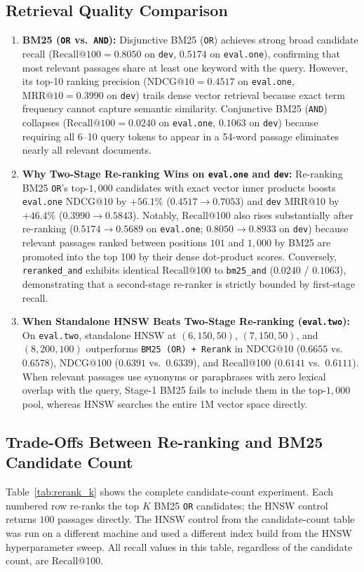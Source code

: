 \documentclass[11pt]{article}
\begin{document}
\subsection{Retrieval Quality Comparison}
\begin{enumerate}
    \item \textbf{BM25 (\texttt{OR} vs.\ \texttt{AND}):} Disjunctive BM25 (\texttt{OR}) achieves strong broad candidate recall ($\text{Recall@100} = 0.8050$ on \texttt{dev}, $0.5174$ on \texttt{eval.one}), confirming that most relevant passages share at least one keyword with the query. However, its top-10 ranking precision ($\text{NDCG@10} = 0.4517$ on \texttt{eval.one}, $\text{MRR@10} = 0.3990$ on \texttt{dev}) trails dense vector retrieval because exact term frequency cannot capture semantic similarity. Conjunctive BM25 (\texttt{AND}) collapses ($\text{Recall@100} = 0.0240$ on \texttt{eval.one}, $0.1063$ on \texttt{dev}) because requiring all 6--10 query tokens to appear in a 54-word passage eliminates nearly all relevant documents.
    \item \textbf{Why Two-Stage Re-ranking Wins on \texttt{eval.one} and \texttt{dev}:} Re-ranking BM25 \texttt{OR}'s top-$1{,}000$ candidates with exact vector inner products boosts \texttt{eval.one} NDCG@10 by $+56.1\%$ ($0.4517 \to 0.7053$) and \texttt{dev} MRR@10 by $+46.4\%$ ($0.3990 \to 0.5843$). Notably, Recall@100 also rises substantially after re-ranking ($0.5174 \to 0.5689$ on \texttt{eval.one}; $0.8050 \to 0.8933$ on \texttt{dev}) because relevant passages ranked between positions $101$ and $1{,}000$ by BM25 are promoted into the top 100 by their dense dot-product scores. Conversely, \texttt{reranked\_and} exhibits identical Recall@100 to \texttt{bm25\_and} ($0.0240$ / $0.1063$), demonstrating that a second-stage re-ranker is strictly bounded by first-stage recall.
    \item \textbf{When Standalone HNSW Beats Two-Stage Re-ranking (\texttt{eval.two}):} On \texttt{eval.two}, standalone HNSW at $(6, 150, 50)$, $(7, 150, 50)$, and $(8, 200, 100)$ outperforms \texttt{BM25 (OR) + Rerank} in NDCG@10 ($0.6655$ vs.\ $0.6578$), NDCG@100 ($0.6391$ vs.\ $0.6339$), and Recall@100 ($0.6141$ vs.\ $0.6111$). When relevant passages use synonyms or paraphrases with zero lexical overlap with the query, Stage-1 BM25 fails to include them in the top-$1{,}000$ pool, whereas HNSW searches the entire 1M vector space directly.
\end{enumerate}

\subsection{Trade-Offs Between Re-ranking and BM25 Candidate Count}
Table~\ref{tab:rerank_k} shows the complete candidate-count experiment. Each numbered row re-ranks the top $K$ BM25 \texttt{OR} candidates; the HNSW control returns $100$ passages directly. The HNSW control from the candidate-count table was run on a different machine and used a different index build from the HNSW hyperparameter sweep. All recall values in this table, regardless of the candidate count, are Recall@100.
\end{document}
